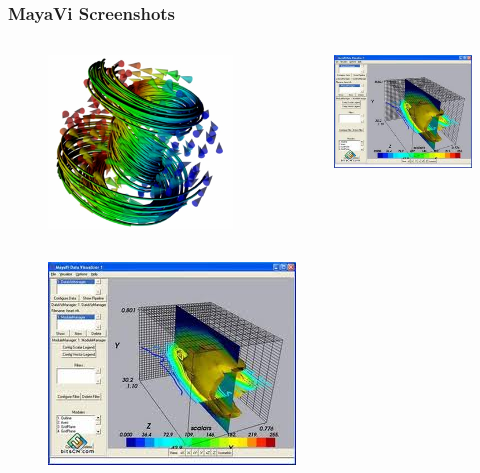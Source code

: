 \documentclass[compress=true]{beamer}
\begin{document}
\begin{frame}
	\frametitle{MayaVi Screenshots}
	\begin{columns}
		\begin{column}{0.5\textwidth}
			\begin{figure}
				\includegraphics[height=0.35\textheight]{mayavi-samp.png}
			\end{figure}
		\end{column}
		\begin{column}{0.5\textwidth}
			\begin{figure}
				\includegraphics[height=0.35\textheight]{mayavi_9.png}
			\end{figure}
		\end{column}
	\end{columns}
	\begin{columns}
		\begin{column}{0.5\textwidth}
			\begin{figure}
				\includegraphics[height=0.35\textheight]{mayavi_8.png}

\end{figure}
\end{column}
\end{columns}
\end{frame}
\end{document}
